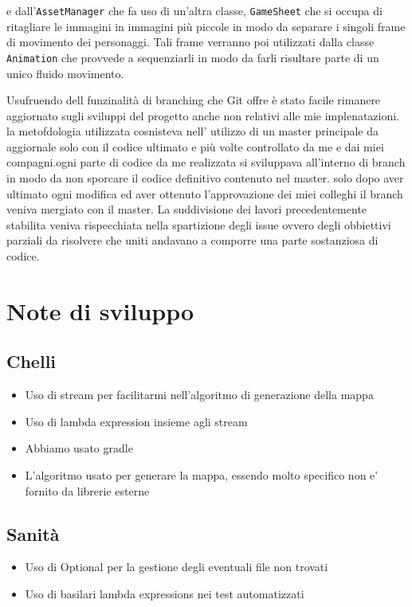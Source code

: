 \documentclass[a4paper,12pt]{report}
\begin{document}
    e dall’\texttt{AssetManager} che fa uso di un’altra classe, \texttt{GameSheet} che si occupa di ritagliare le immagini in immagini più piccole
    in modo da separare i singoli frame di movimento dei personaggi. Tali frame verranno poi utilizzati dalla classe \texttt{Animation} che
    provvede a sequenziarli in modo da farli risultare parte di un unico fluido movimento.
    \par Usufruendo dell funzinalità di branching che Git offre è stato facile rimanere aggiornato sugli sviluppi del progetto anche non
    relativi alle mie implenatazioni. la metofdologia utilizzata cosnisteva nell' utilizzo di un master principale da aggiornale solo con
    il codice ultimato e più volte controllato da me e dai miei compagni.ogni parte di codice da me realizzata si sviluppava all'interno di branch
    in modo da non sporcare il codice definitivo contenuto nel master. solo dopo aver ultimato ogni modifica ed aver ottenuto l'approvazione dei miei colleghi
    il branch veniva mergiato con il master.
    La suddivisione dei lavori precedentemente stabilita veniva rispecchiata nella spartizione degli issue ovvero degli obbiettivi parziali da risolvere che uniti
    andavano a comporre una parte sostanziosa di codice.
    \section{Note di sviluppo}
    \subsection{Chelli}
    \begin{itemize}
        \item Uso di stream per facilitarmi nell'algoritmo di generazione della mappa
        \item Uso di lambda expression insieme agli stream
        \item Abbiamo usato gradle
        \item L'algoritmo usato per generare la mappa, essendo molto specifico non e' fornito da librerie esterne
    \end{itemize}
    \subsection{Sanità}
    \begin{itemize}
            \item Uso di Optional per la gestione degli eventuali file non trovati
            \item Uso di basilari lambda expressions nei test automatizzati
    \end{itemize}
\end{document}
